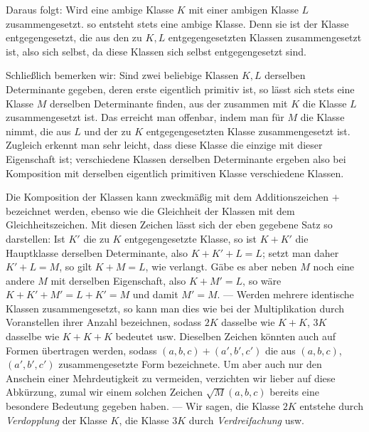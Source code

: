 Daraus folgt: Wird eine ambige Klasse $K$ mit einer ambigen Klasse $L$ zusammengesetzt. so entsteht stets eine ambige Klasse. Denn sie ist der Klasse entgegengesetzt, die aus den zu $K,L$ entgegengesetzten Klassen zusammengesetzt ist, also sich selbst, da diese Klassen sich selbst entgegengesetzt sind.

Schließlich bemerken wir: Sind zwei beliebige Klassen $K,L$ derselben Determinante gegeben, deren erste eigentlich primitiv ist, so lässt sich stets eine Klasse $M$ derselben Determinante finden, aus der zusammen mit $K$ die Klasse $L$ zusammengesetzt ist. Das erreicht man offenbar, indem man für $M$ die Klasse nimmt, die aus $L$ und der zu $K$ entgegengesetzten Klasse zusammengesetzt ist. Zugleich erkennt man sehr leicht, dass diese Klasse die einzige mit dieser Eigenschaft ist; verschiedene Klassen derselben Determinante ergeben also bei Komposition mit derselben eigentlich primitiven Klasse verschiedene Klassen.

Die Komposition der Klassen kann zweckmäßig mit dem Additionszeichen $+$ bezeichnet werden, ebenso wie die Gleichheit der Klassen mit dem Gleichheitszeichen. Mit diesen Zeichen lässt sich der eben gegebene Satz so darstellen: Ist $K'$ die zu $K$ entgegengesetzte Klasse, so ist $K+K'$ die Hauptklasse derselben Determinante, also $K+K'+L=L$; setzt man daher $K'+L=M$, so gilt $K+M=L$, wie verlangt. Gäbe es aber neben $M$ noch eine andere $M$ mit derselben Eigenschaft, also $K+M'=L$, so wäre $K+K'+M'=L+K'=M$ und damit $M'=M$. --- Werden mehrere identische Klassen zusammengesetzt, so kann man dies wie bei der Multiplikation durch Voranstellen ihrer Anzahl bezeichnen, sodass $2K$ dasselbe wie $K+K$, $3K$ dasselbe wie $K+K+K$ bedeutet usw. Dieselben Zeichen könnten auch auf Formen übertragen werden, sodass $(a,b,c)+(a',b',c')$ die aus $(a,b,c)$, $(a',b',c')$ zusammengesetzte Form bezeichnete. Um aber auch nur den Anschein einer Mehrdeutigkeit zu vermeiden, verzichten wir lieber auf diese Abkürzung, zumal wir einem solchen Zeichen $\surd M(a,b,c)$ bereits eine besondere Bedeutung gegeben haben. --- Wir sagen, die Klasse $2K$ entstehe durch \textit{Verdopplung} der Klasse $K$, die Klasse $3K$ durch \textit{Verdreifachung} usw.

